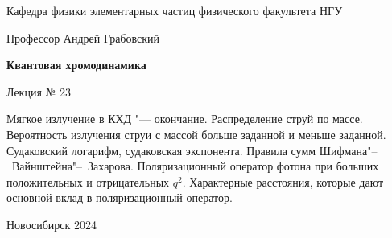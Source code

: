 \documentclass[12pt,pagesize,paper=landscape,paper=192mm:108mm]{scrbook}
\begin{document}
\begin{titlepage}
\begin{center}
    Кафедра физики элементарных частиц физического факультета НГУ
    \medskip

    \Large
    Профессор Андрей Грабовский
    
    \bigskip

    \huge
    \textbf{Квантовая хромодинамика}
    \medskip

    \Large
    Лекция № 23
    \vfill

    \normalsize
    \begin{minipage}{0.9\linewidth}
      Мягкое излучение в КХД "--- окончание. Распределение струй по
      массе. Вероятность излучения струи с массой больше заданной и
      меньше заданной. Судаковский логарифм, судаковская экспонента.  
      Правила сумм Шифмана"--~Вайнштейна"--~Захарова. Поляризационный
      оператор фотона при больших положительных и отрицательных
      $q^2$. Характерные расстояния, которые дают основной вклад в
      поляризационный оператор.
    \end{minipage}
    \vfill

    \normalsize \ccbysa\hspace{0.5em}  Новосибирск 2024
  \end{center}
\end{titlepage}
\end{document}
